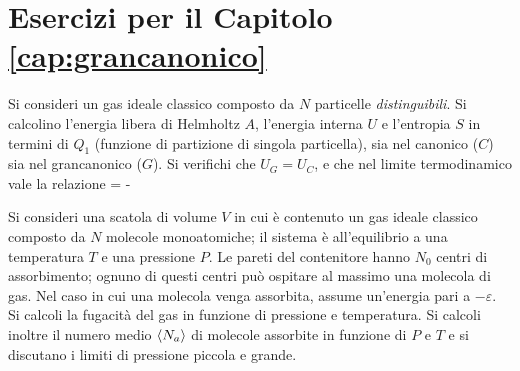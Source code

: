 \section{Esercizi per il Capitolo \ref{cap:grancanonico}}


\begin{Exercise}[title={Equivalenza tra \ensembles},label={ex:05-eqcgc}]
\noindent
Si consideri un gas ideale classico composto da $N$ particelle {\em distinguibili}. Si calcolino l'energia libera di Helmholtz $A$, l'energia interna $U$ e l'entropia $S$ in termini di $Q_1$ (funzione di partizione di singola particella), sia nel canonico ($C$) sia nel grancanonico ($G$). Si verifichi che $U_G = U_C$, e che nel limite termodinamico vale la relazione
\be
{} = - \simeq {}
\ee
\end{Exercise}



\begin{Exercise}[title={Scatola a sorpresa},label={ex:05-sas}]
\noindent
Si consideri una scatola di volume $V$ in cui è contenuto un gas ideale classico composto da $N$ molecole monoatomiche; il sistema è all'equilibrio a una temperatura $T$ e una pressione $P$. Le pareti del contenitore hanno $N_0$ centri di assorbimento; ognuno di questi centri può ospitare al massimo una molecola di gas. Nel caso in cui una molecola venga assorbita, assume un'energia pari a $-\varepsilon$. Si calcoli la fugacità del gas in funzione di pressione e temperatura. Si calcoli inoltre il numero medio $\langle N_a\rangle$ di molecole assorbite in funzione di $P$ e $T$ e si discutano i limiti di pressione piccola e grande.
\end{Exercise}


